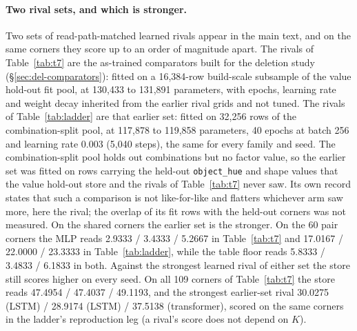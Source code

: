 \documentclass{article} %
\begin{document}
\paragraph{Two rival sets, and which is stronger.} Two sets of read-path-matched learned rivals
appear in the main text, and on the same corners they score up to an order of magnitude apart.
The rivals of Table~\ref{tab:t7} are the as-trained comparators built for the deletion study
(\S\ref{sec:del-comparators}): fitted on a 16,384-row build-scale subsample of the value %
hold-out fit pool, at 130,433 to 131,891 parameters, with epochs, learning rate and weight %
decay inherited from the earlier rival grids and not tuned. %
The rivals of Table~\ref{tab:ladder} are that earlier set: fitted on 32,256 rows of the %
combination-split pool, at 117,878 to 119,858 parameters, 40 epochs at batch 256 and learning %
rate 0.003 (5,040 steps), the same for every family and seed. %
The combination-split pool holds out combinations but no factor value, so the earlier set was
fitted on rows carrying the held-out \texttt{object\_hue} and shape values that the value
hold-out store and the rivals of Table~\ref{tab:t7} never saw. Its own record states that such a
comparison is not like-for-like and flatters whichever arm saw more, here the rival; the overlap
of its fit rows with the held-out corners was not measured.
On the shared corners the earlier set is the stronger. On the 60 pair corners the MLP reads %
2.9333 / 3.4333 / 5.2667 in Table~\ref{tab:t7} and 17.0167 / 22.0000 / 23.3333 in %
Table~\ref{tab:ladder}, while the table floor reads 5.8333 / 3.4833 / 6.1833 in both. %
Against the strongest learned rival of either set the store still scores higher on every seed.
On all 109 corners of Table~\ref{tab:t7} the store reads 47.4954 / 47.4037 / 49.1193, and the %
strongest earlier-set rival 30.0275 (LSTM) / 28.9174 (LSTM) / 37.5138 (transformer), scored on %
the same corners in the ladder's reproduction leg (a rival's score does not depend on $K$). %
\end{document}
